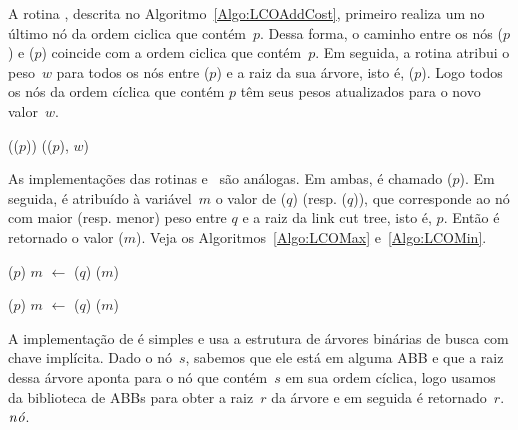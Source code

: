 A rotina \LCOAddCost{}, descrita no Algoritmo~\ref{Algo:LCOAddCost}, primeiro realiza um \linkcutEvert{} no último nó da ordem ciclica que contém~$p$.
Dessa forma, o caminho entre os nós \treapFirst($p$) e \treapLast($p$) coincide com a ordem ciclica que contém~$p$.
Em seguida, a rotina \linkcutWeight{} atribui o peso~$w$ para todos os nós entre \treapFirst($p$) e a raiz da sua árvore, isto é, \treapLast($p$).
Logo todos os nós da ordem cíclica que contém $p$ têm seus pesos atualizados para o novo valor~$w$.

\begin{algorithm}[htb]
\caption{\LCOAddCost($p$, $w$)}
\label{Algo:LCOAddCost}
\begin{algorithmic}[1]
\State \linkcutEvert(\treapLast($p$))
\State \linkcutWeight(\treapFirst($p$), $w$)
\end{algorithmic}
\end{algorithm}

As implementações das rotinas \LCOMax{} e~\LCOMin{} são análogas.
Em ambas, é chamado \linkcutEvert($p$).
Em seguida, é atribuído à variável~$m$ o valor de \linkcutMax($q$) (resp. \linkcutMin($q$)), que corresponde ao nó com maior (resp. menor) peso entre $q$ e a raiz da link cut tree, isto é, $p$.
Então é retornado o valor \LCOFindNode($m$).
Veja os Algoritmos~\ref{Algo:LCOMax} e~\ref{Algo:LCOMin}.

\begin{algorithm}[htb]
\caption{\LCOMax($p$, $q$)}
\label{Algo:LCOMax}
\begin{algorithmic}[1]
\State \linkcutEvert($p$)
\State $m$ $\gets$ \linkcutMax($q$)
\State \Return \LCOFindNode($m$)
\end{algorithmic}
\end{algorithm}

\begin{algorithm}[htb]
\caption{\LCOMin($p$, $q$)}
\label{Algo:LCOMin}
\begin{algorithmic}[1]
\State \linkcutEvert($p$)
\State $m$ $\gets$ \linkcutMin($q$)
\State \Return \LCOFindNode($m$)
\end{algorithmic}
\end{algorithm}

A implementação de \LCOFindNode{} é simples e usa a estrutura de árvores binárias de busca com chave implícita.
Dado o nó~$s$, sabemos que ele está em alguma ABB e que a raiz dessa árvore aponta para o nó que contém~$s$ em sua ordem cíclica,
logo usamos \treapGetRoot{} da biblioteca de ABBs para obter a raiz~$r$ da árvore e em seguida é retornado~$r$.$\mathit{n\acute{o}}$.

